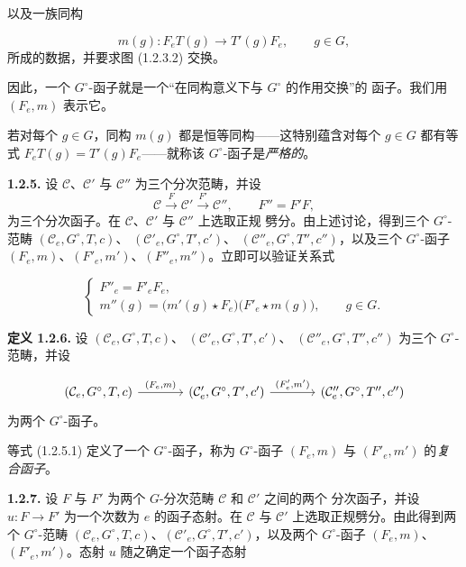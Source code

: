 \clearpage
{}%
以及一族同构

\[
  m(g)\colon F_eT(g)\longrightarrow T'(g)F_e,
  \qquad g\in G,
\]
所成的数据，并要求图 (1.2.3.2) 交换。

因此，一个 $G^\circ$-函子就是一个“在同构意义下与 $G^\circ$ 的作用交换”的
函子。我们用 $(F_e,m)$ 表示它。

若对每个 $g\in G$，同构 $m(g)$ 都是恒等同构——这特别蕴含对每个 $g\in G$
都有等式 $F_eT(g)=T'(g)F_e$——就称该 $G^\circ$-函子是\emph{严格的}。

\noindent\textbf{1.2.5.}\quad
设 $\mathcal C$、$\mathcal C'$ 与 $\mathcal C''$ 为三个分次范畴，并设
\[
  \mathcal C\xrightarrow{F}\mathcal C'
  \xrightarrow{F'}\mathcal C'',\qquad F''=F'F,
\]
为三个分次函子。在 $\mathcal C$、$\mathcal C'$ 与 $\mathcal C''$ 上选取正规
劈分。由上述讨论，得到三个 $G^\circ$-范畴
$(\mathcal C_e,G^\circ,T,c)$、
$(\mathcal C'_e,G^\circ,T',c')$、
$(\mathcal C''_e,G^\circ,T'',c'')$，以及三个 $G^\circ$-函子
$(F_e,m)$、$(F'_e,m')$、$(F''_e,m'')$。立即可以验证关系式

\begin{equation}
  \begin{cases}
    F''_e=F'_eF_e,\\[0.5em]
    m''(g)=\bigl(m'(g)\star F_e\bigr)
      \bigl(F'_e\star m(g)\bigr),\qquad g\in G.
  \end{cases}
  \tag{1.2.5.1}
\end{equation}

\noindent\textbf{定义 1.2.6.}\quad
设 $(\mathcal C_e,G^\circ,T,c)$、
$(\mathcal C'_e,G^\circ,T',c')$、
$(\mathcal C''_e,G^\circ,T'',c'')$ 为三个 $G^\circ$-范畴，并设

\[
\begin{tikzcd}[column sep=large]
(\mathcal C_e,G^\circ,T,c)
  \arrow[r,"{(F_e,m)}"]
&
(\mathcal C'_e,G^\circ,T',c')
  \arrow[r,"{(F_e^{\prime},m^{\prime})}"]
&
(\mathcal C''_e,G^\circ,T'',c'')
\end{tikzcd}
\]
为两个 $G^\circ$-函子。

等式 (1.2.5.1) 定义了一个 $G^\circ$-函子，称为 $G^\circ$-函子
$(F_e,m)$ 与 $(F'_e,m')$ 的\emph{复合函子}。

\noindent\textbf{1.2.7.}\quad
设 $F$ 与 $F'$ 为两个 $G$-分次范畴 $\mathcal C$ 和 $\mathcal C'$ 之间的两个
分次函子，并设 $u\colon F\to F'$ 为一个次数为 $e$ 的函子态射。在
$\mathcal C$ 与 $\mathcal C'$ 上选取正规劈分。由此得到两个 $G^\circ$-范畴
$(\mathcal C_e,G^\circ,T,c)$、$(\mathcal C'_e,G^\circ,T',c')$，以及两个
$G^\circ$-函子 $(F_e,m)$、$(F'_e,m')$。态射 $u$ 随之确定一个函子态射

